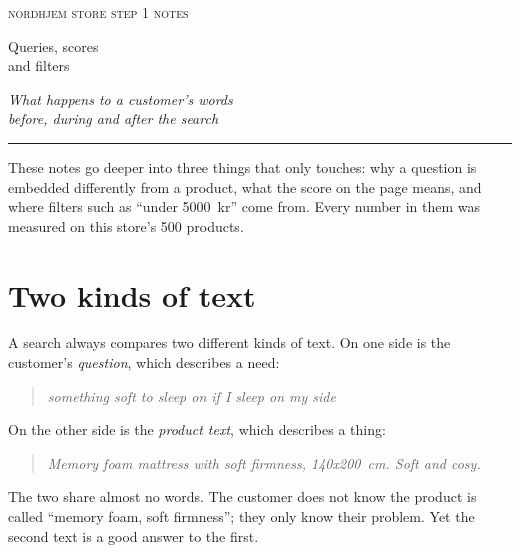 \documentclass[11pt]{article}
\begin{document}
\thispagestyle{empty}
\setlength{\parindent}{0pt}
\vspace*{1.2cm}
{\color{muted}\scshape\MakeLowercase{Nordhjem store}
  \textperiodcentered{} \MakeLowercase{Step 1 notes}}\par
\vspace{0.9cm}
{\fontsize{28}{32}\selectfont Queries, scores\\[2pt] and filters\par}
\vspace{0.5cm}
{\large\itshape\color{muted} What happens to a customer's words\\
  before, during and after the search\par}
\vspace{0.6cm}
{\color{accent}\rule{2.2cm}{1.2pt}}\par
\vspace{0.6cm}
\begin{minipage}{11.5cm}
\small\color{muted}
These notes go deeper into three things that  only
touches: why a question is embedded differently from a product, what
the score on the page means, and where filters such as ``under
5000~kr'' come from. Every number in them was measured on this store's
500 products.
\end{minipage}
\vspace{1.0cm}

{\small
\renewcommand{\contentsname}{\normalsize\scshape\color{muted}
  \MakeLowercase{Contents}}
\tableofcontents}

\newpage
\setlength{\parindent}{1.2em}

\section{Two kinds of text}
\label{sec:two-kinds}

A search always compares two different kinds of text. On one side is
the customer's \emph{question}, which describes a need:
\begin{quote}\itshape
something soft to sleep on if I sleep on my side
\end{quote}
On the other side is the \emph{product text}, which describes a thing:
\begin{quote}\itshape
Memory foam mattress with soft firmness, 140x200~cm. Soft and cosy.
\end{quote}
The two share almost no words. The customer does not know the product
is called ``memory foam, soft firmness''; they only know their problem.
Yet the second text is a good answer to the first.
\end{document}
